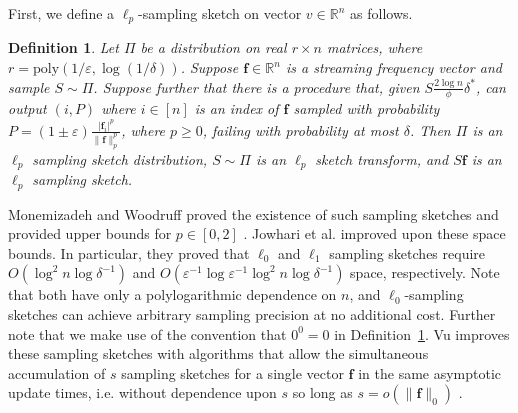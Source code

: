 \documentclass[10]{report}
\newtheorem{definition}{Definition}[section]
\newcommand{\algoname}[1]{\textnormal{\textsc{#1}}}
\newcommand{\poly}{\mathrm{poly}}
\begin{document}
First, we define a $\ell_p$-sampling sketch on vector $v \in \mathbb{R}^n$ as follows.
%
\begin{definition} \label{def:lp-sample}
Let $\Pi$ be a distribution on real $r \times n$ matrices, where $r = \poly(1/\varepsilon, \log(1/\delta))$. 
Suppose $\mathbf{f} \in \mathbb{R}^n$ is a streaming frequency vector and sample $S \sim \Pi$. 
Suppose further that there is a procedure that, given $S\frac{2\log n}{\phi}\delta^*$, can output $(i,P)$ where $i \in [n]$ is an index of $\mathbf{f}$ sampled with probability $P = (1 \pm \varepsilon)\frac{|\mathbf{f}_i|^p}{\|\mathbf{f}\|^p_p}$, where $p \geq 0$, failing with probability at most $\delta$. 
Then $\Pi$ is an $\ell_p$ sampling sketch distribution, $S \sim \Pi$ is an $\ell_p$ sketch transform, and $S\mathbf{f}$ is an $\ell_p$ sampling sketch.
\end{definition}
%

Monemizadeh and Woodruff proved the existence of such sampling sketches and provided upper bounds for $p \in [0,2]$ \cite{monemizadeh20101}.
Jowhari et al. \cite{jowhari2011tight} improved upon these space bounds.
In particular, they proved that $\ell_0$ and $\ell_1$ sampling sketches require $O(\log^2 n \log \delta^{-1})$ and $O(\varepsilon^{-1} \log \varepsilon^{-1} \log^2 n \log \delta^{-1})$ space, respectively.
Note that both have only a polylogarithmic dependence on $n$, and $\ell_0$-sampling sketches can achieve arbitrary sampling precision at no additional cost. 
Further note that we make use of the convention that $0^0 = 0$ in Definition~\ref{def:lp-sample}.
Vu improves these sampling sketches with algorithms that allow the simultaneous accumulation of $s$ sampling sketches for a single vector $\mathbf{f}$ in the same asymptotic update times, i.e. without dependence upon $s$ so long as $s = o(\|\mathbf{f}\|_0)$ \cite{vu2018data}.
\end{document}
